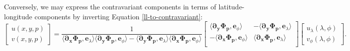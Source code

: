 Conversely, we may express the contravariant components in terms of
latitude-longitude components by inverting Equation \eqref{ll-to-contravariant}:
\begin{equation}
	\label{contravariant-to-ll}
	\begin{bmatrix}
		{u}(x,y,p) \\
		{v}(x,y,p)
	\end{bmatrix}
	=
	\frac{1}{\langle \boldsymbol{\partial_x \Phi_p}, \boldsymbol{e}_\lambda\rangle
		\langle \boldsymbol{\partial_y \Phi_p}, \boldsymbol{e}_\phi \rangle
		-\langle \boldsymbol{\partial_y \Phi_p}, \boldsymbol{e}_\lambda \rangle
		\langle \boldsymbol{\partial_x \Phi_p}, \boldsymbol{e}_\phi \rangle}
	\begin{bmatrix}
		\langle \boldsymbol{\partial_y \Phi_p}, \boldsymbol{e}_\phi \rangle 
		&-\langle \boldsymbol{\partial_y \Phi_p}, \boldsymbol{e}_\lambda \rangle \\
		-\langle \boldsymbol{\partial_x \Phi_p}, \boldsymbol{e}_\phi \rangle 
		& \langle \boldsymbol{\partial_x \Phi_p}, \boldsymbol{e}_\lambda \rangle \\
	\end{bmatrix}
	\begin{bmatrix}
		u_\lambda (\lambda, \phi) \\
		v_\phi (\lambda, \phi) 
	\end{bmatrix}.
\end{equation}

